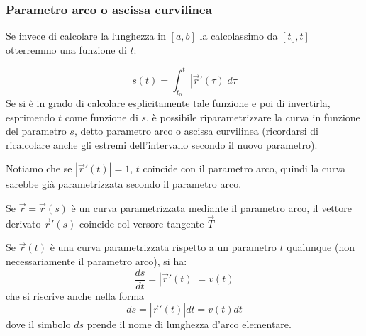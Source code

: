 \subsubsection{Parametro arco o ascissa curvilinea}
Se invece di calcolare la lunghezza in $[a,b]$ la calcolassimo da $[t_0, t]$ otterremmo una funzione di $t$:
\begin{tcolorbox}
\[
    s(t) = \int_{t_0}^{t}|\vec{r}'(\tau)|d\tau
\]
Se si è in grado di calcolare esplicitamente tale funzione e poi di invertirla, esprimendo $t$ come funzione di $s$, è possibile riparametrizzare la curva in funzione del parametro $s$, detto parametro arco o ascissa curvilinea (ricordarsi di ricalcolare anche gli estremi dell'intervallo secondo il nuovo parametro).\newline
\end{tcolorbox}
\begin{tcolorbox}
Notiamo che se $|\vec{r}'(t)| = 1$, $t$ coincide con il parametro arco, quindi la curva sarebbe già parametrizzata secondo  il parametro arco.
\end{tcolorbox}
Se $\vec{r} = \vec{r}(s)$ è un curva parametrizzata mediante il parametro arco, il vettore derivato $\vec{r}'(s)$ coincide col versore tangente $\vec{T}$
\newline
\begin{tcolorbox}
Se $\vec{r}(t)$ è una curva parametrizzata rispetto a un parametro $t$ qualunque (non necessariamente il parametro arco), si ha:
\[
    \frac{ds}{dt} =|\vec{r}'(t)| = v(t)
\]
che si riscrive anche nella forma
\[
    ds =|\vec{r}'(t)|dt =v(t) dt
\] 
dove il simbolo $ds$ prende il nome di lunghezza d'arco elementare.
\end{tcolorbox}
